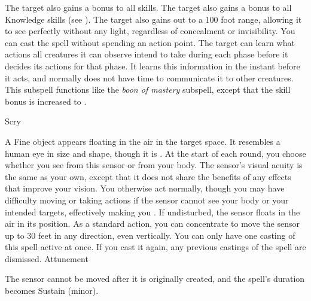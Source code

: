 The target also gains a  bonus to all skills.
The target also gains a  bonus to all Knowledge skills (see ).
The target also gains  out to a 100 foot range, allowing it to see perfectly without any light, regardless of concealment or invisibility.
You can cast the spell without spending an action point.
The target can learn what actions all creatures it can observe intend to take during each phase before it decides its actions for that phase.
It learns this information in the instant before it acts, and normally does not have time to communicate it to other creatures.
This subspell functions like the \textit{boon of mastery} subspell, except that the skill bonus is increased to .
\begin{spellsection}{Scry}
\begin{spellheader}
\end{spellheader}
\begin{spellcontent}
\begin{spelltargetinginfo}
\end{spelltargetinginfo}
\begin{spelleffects}
\spelleffect
A Fine object appears floating in the air in the target space.
It resembles a human eye in size and shape, though it is .
At the start of each round, you choose whether you see from this sensor or from your body.
The sensor's visual acuity is the same as your own, except that it does not share the benefits of any  effects that improve your vision.
You otherwise act normally, though you may have difficulty moving or taking actions if the sensor cannot see your body or your intended targets, effectively making you \blinded.
If undisturbed, the sensor floats in the air in its position.
As a standard action, you can concentrate to move the sensor up to 30 feet in any direction, even vertically.
You can only have one casting of this spell active at once.
If you cast it again, any previous castings of the spell are dismissed.
\spelldur Attunement
\end{spelleffects}
\end{spellcontent}
\begin{spellfooter}
\end{spellfooter}
\begin{spellsubcontent}
\begin{spellcantrip}
The sensor cannot be moved after it is originally created, and the spell's duration becomes Sustain (minor).
\end{spellcantrip}
\end{spellsubcontent}
\end{spellsection}
